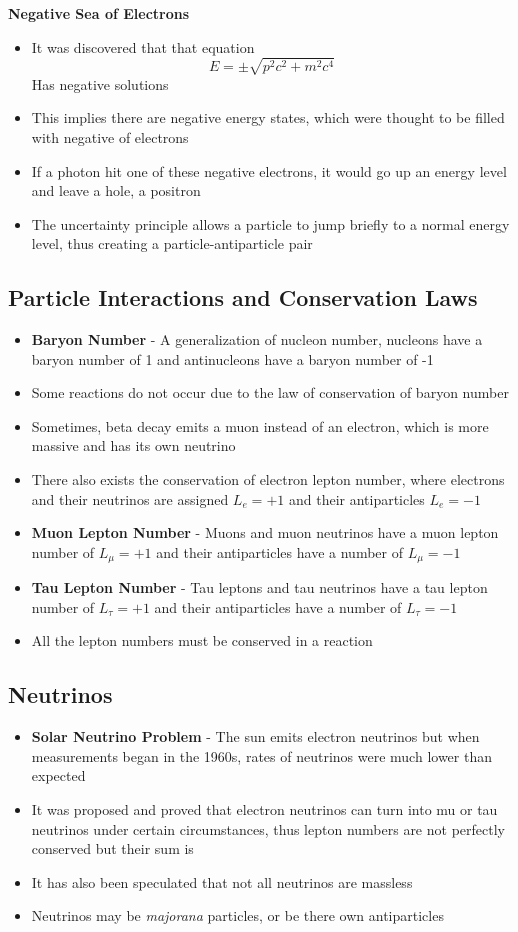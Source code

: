 \textbf{Negative Sea of Electrons}
\begin{itemize}
    \item It was discovered that that equation \[E=\pm\sqrt{p^2c^2+m^2c^4}\] Has negative solutions
    \item This implies there are negative energy states, which were thought to be filled with negative of electrons
    \item If a photon hit one of these negative electrons, it would go up an energy level and leave a hole, a positron
    \item The uncertainty principle allows a particle to jump briefly to a normal energy level, thus creating a particle-antiparticle pair
\end{itemize}

\subsection{Particle Interactions and Conservation Laws}
\begin{itemize}
    \item \textbf{Baryon Number} - A generalization of nucleon number, nucleons have a baryon number of 1 and antinucleons have a baryon number of -1
    \item Some reactions do not occur due to the law of conservation of baryon number
    \item Sometimes, beta decay emits a muon instead of an electron, which is more massive and has its own neutrino
    \item There also exists the conservation of electron lepton number, where electrons and their neutrinos are assigned \(L_e=+1\) and their antiparticles \(L_e=-1\)
    \item \textbf{Muon Lepton Number} - Muons and muon neutrinos have a muon lepton number of \(L_{\mu}=+1\) and their antiparticles have a number of \(L_{\mu}=-1\)
    \item \textbf{Tau Lepton Number} - Tau leptons and tau neutrinos have a tau lepton number of \(L_{\tau}=+1\) and their antiparticles have a number of \(L_{\tau}=-1\)
    \item All the lepton numbers must be conserved in a reaction
\end{itemize}

\subsection{Neutrinos}
\begin{itemize}
    \item \textbf{Solar Neutrino Problem} - The sun emits electron neutrinos but when measurements began in the 1960s, rates of neutrinos were much lower than expected
    \item It was proposed and proved that electron neutrinos can turn into mu or tau neutrinos under certain circumstances, thus lepton numbers are not perfectly conserved but their sum is 
    \item It has also been speculated that not all neutrinos are massless
    \item Neutrinos may be \emph{majorana} particles, or be there own antiparticles
\end{itemize}

